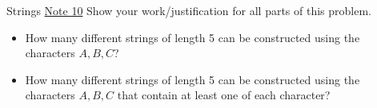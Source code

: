 \begin{homeworkProblem}{Strings}
\href{https://www.eecs70.org/assets/pdf/notes/n10.pdf}{Note 10}
Show your work/justification for all parts of this problem.
\begin{itemize}
    \item How many different strings of length 5 can be constructed using the 
    characters $A, B, C$?
    
    \solution

    \item How many different strings of length 5 can be constructed using the 
    characters $A, B, C$ that contain at least one of each character?
    
    \solution

\end{itemize}
\end{homeworkProblem}
